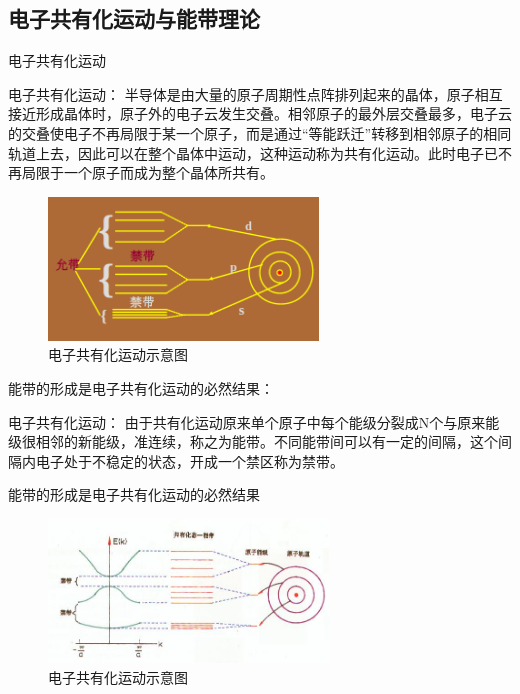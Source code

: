 \documentclass[trans]{beamer} %
\begin{document}
\subsection{电子共有化运动与能带理论}
\begin{frame}{电子共有化运动}
    

    \begin{alertblock}{电子共有化运动：}
    半导体是由大量的原子周期性点阵排列起来的晶体，原子相互接近形成晶体时，原子外的电子云发生交叠。相邻原子的最外层交叠最多，电子云的交叠使电子不再局限于某一个原子，而是通过“等能跃迁”转移到相邻原子的相同轨道上去，因此可以在整个晶体中运动，这种运动称为共有化运动。此时电子已不再局限于一个原子而成为整个晶体所共有。
    \end{alertblock}
    \begin{figure}[htbp] 
    \centering\includegraphics[height=1.5in]{source/ch2/fg211.png} 
    \caption{电子共有化运动示意图}
    \end{figure}  
   
 
 \end{frame}

\begin{frame}{能带的形成是电子共有化运动的必然结果：}
    

    \begin{alertblock}{电子共有化运动：}
    由于共有化运动原来单个原子中每个能级分裂成N个与原来能级很相邻的新能级，准连续，称之为能带。不同能带间可以有一定的间隔，这个间隔内电子处于不稳定的状态，开成一个禁区称为禁带。
    
    能带的形成是电子共有化运动的必然结果
    \end{alertblock}
    \begin{figure}[htbp] 
    \centering\includegraphics[height=1.5in]{source/ch2/fg212.png} 
    \caption{电子共有化运动示意图}
    \end{figure}  
   
 
 \end{frame}
\end{document}
